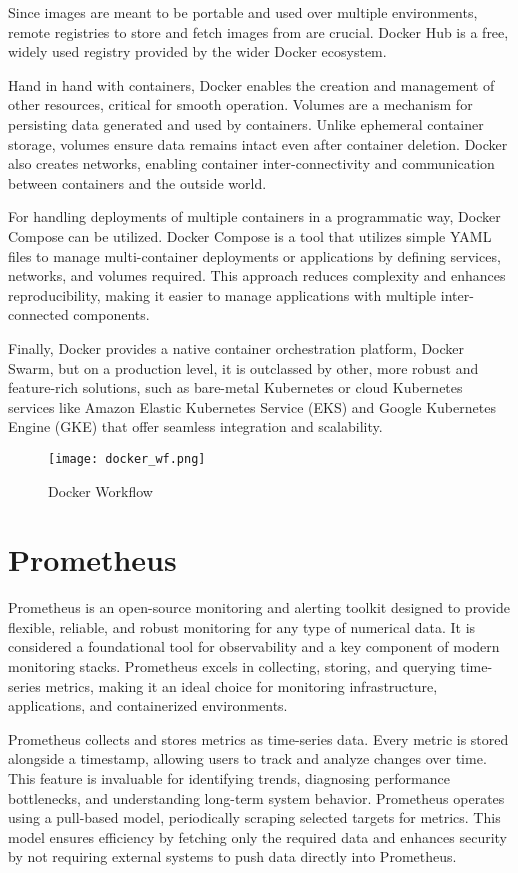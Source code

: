 Since images are meant to be portable and used over multiple environments, remote registries to store and fetch images from are crucial. Docker Hub is a free, widely used registry provided by the wider Docker ecosystem.

Hand in hand with containers, Docker enables the creation and management of other resources, critical for smooth operation. Volumes are a mechanism for persisting data generated and used by containers. Unlike ephemeral container storage, volumes ensure data remains intact even after container deletion. Docker also creates networks, enabling container inter-connectivity and communication between containers and the outside world.

For handling deployments of multiple containers in a programmatic way, Docker Compose can be utilized. Docker Compose is a tool that utilizes simple YAML files to manage multi-container deployments or applications by defining services, networks, and volumes required. This approach reduces complexity and enhances reproducibility, making it easier to manage applications with multiple inter-connected components.

Finally, Docker provides a native container orchestration platform, Docker Swarm, but on a production level, it is outclassed by other, more robust and feature-rich solutions, such as bare-metal Kubernetes or cloud Kubernetes services like Amazon Elastic Kubernetes Service (EKS) and Google Kubernetes Engine (GKE) that offer seamless integration and scalability.\cite{containers_docker}


\begin{figure}[!h]
    \graphicspath{ {./diagrams/} }
    \texttt{[image: docker\_wf.png]}
    \centering
    \caption{Docker Workflow}
    \label{fig:docker_wf}
\end{figure}

\section{Prometheus}
Prometheus is an open-source monitoring and alerting toolkit designed to provide flexible, reliable, and robust monitoring for any type of numerical data. It is considered a foundational tool for observability and a key component of modern monitoring stacks. Prometheus excels in collecting, storing, and querying time-series metrics, making it an ideal choice for monitoring infrastructure, applications, and containerized environments.

Prometheus collects and stores metrics as time-series data. Every metric is stored alongside a timestamp, allowing users to track and analyze changes over time. This feature is invaluable for identifying trends, diagnosing performance bottlenecks, and understanding long-term system behavior. Prometheus operates using a pull-based model, periodically scraping selected targets for metrics. This model ensures efficiency by fetching only the required data and enhances security by not requiring external systems to push data directly into Prometheus.

